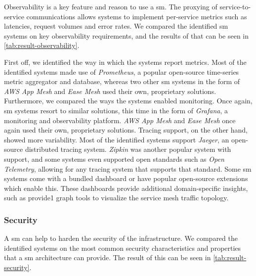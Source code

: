 

Observability is a key feature and reason to use a \gls{sm}. The proxying of service-to-service communications allows systems to implement per-service metrics such as latencies, request volumes and error rates. We compared the identified \gls{sm} systems on key observability requirements, and the results of that can be seen in \cref{tab:result-observability}. 

First off, we identified the way in which the systems report metrics. Most of the identified systems made use of \textit{Prometheus}, a popular open-source time-series metric aggregator and database, whereas two other \gls{sm} systems in the form of \textit{AWS App Mesh} and \textit{Ease Mesh} used their own, proprietary solutions. Furthermore, we compared the ways the systems enabled monitoring. Once again, \gls{sm} systems resort to similar solutions, this time in the form of \textit{Grafana}, a monitoring and observability platform. \textit{AWS App Mesh} and \textit{Ease Mesh} once again used their own, proprietary solutions. Tracing support, on the other hand, showed more variability. Most of the identified systems support \textit{Jaeger}, an open-source distributed tracing system. \textit{Zipkin} was another popular system with support, and some systems even supported open standards such as \textit{Open Telemetry}, allowing for any tracing system that supports that standard. Some \gls{sm} systems come with a bundled dashboard or have popular open-source extensions which enable this. These dashboards provide additional domain-specific insights, such as provide1 graph tools to visualize the service mesh traffic topology. 

\subsubsection{Security}
\label{sec:survey:results:comparison:security}



A \gls{sm} can help to harden the security of the infrastructure. We compared the identified systems on the most common security characteristics and properties that a \gls{sm} architecture can provide. The result of this can be seen in \cref{tab:result-security}. 

